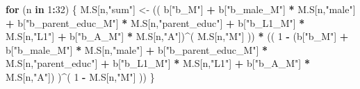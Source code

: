 \documentclass[
]{book}
\newenvironment{Shaded}{\begin{snugshade}}{\end{snugshade}}
\newcommand{\ControlFlowTok}[1]{\textcolor[rgb]{0.13,0.29,0.53}{\textbf{#1}}}
\newcommand{\DecValTok}[1]{\textcolor[rgb]{0.00,0.00,0.81}{#1}}
\newcommand{\NormalTok}[1]{#1}
\newcommand{\OtherTok}[1]{\textcolor[rgb]{0.56,0.35,0.01}{#1}}
\newcommand{\SpecialCharTok}[1]{\textcolor[rgb]{0.81,0.36,0.00}{\textbf{#1}}}
\newcommand{\StringTok}[1]{\textcolor[rgb]{0.31,0.60,0.02}{#1}}
\begin{document}
\begin{Shaded}
\begin{Highlighting}[]
  \ControlFlowTok{for}\NormalTok{ (n }\ControlFlowTok{in} \DecValTok{1}\SpecialCharTok{:}\DecValTok{32}\NormalTok{) \{}
\NormalTok{    M.S[n,}\StringTok{"sum"}\NormalTok{] }\OtherTok{\textless{}{-}}\NormalTok{ (( b[}\StringTok{"b\_M"}\NormalTok{] }\SpecialCharTok{+}                                                              
\NormalTok{                         b[}\StringTok{"b\_male\_M"}\NormalTok{] }\SpecialCharTok{*}\NormalTok{ M.S[n,}\StringTok{"male"}\NormalTok{] }\SpecialCharTok{+} 
\NormalTok{                         b[}\StringTok{"b\_parent\_educ\_M"}\NormalTok{] }\SpecialCharTok{*}\NormalTok{ M.S[n,}\StringTok{"parent\_educ"}\NormalTok{] }\SpecialCharTok{+} 
\NormalTok{                         b[}\StringTok{"b\_L1\_M"}\NormalTok{] }\SpecialCharTok{*}\NormalTok{ M.S[n,}\StringTok{"L1"}\NormalTok{] }\SpecialCharTok{+}
\NormalTok{                         b[}\StringTok{"b\_A\_M"}\NormalTok{] }\SpecialCharTok{*}\NormalTok{ M.S[n,}\StringTok{"A"}\NormalTok{])}\SpecialCharTok{\^{}}\NormalTok{( M.S[n,}\StringTok{"M"}\NormalTok{] )) }\SpecialCharTok{*}
\NormalTok{      (( }\DecValTok{1} \SpecialCharTok{{-}}\NormalTok{ (b[}\StringTok{"b\_M"}\NormalTok{] }\SpecialCharTok{+} 
\NormalTok{                b[}\StringTok{"b\_male\_M"}\NormalTok{] }\SpecialCharTok{*}\NormalTok{ M.S[n,}\StringTok{"male"}\NormalTok{] }\SpecialCharTok{+} 
\NormalTok{                b[}\StringTok{"b\_parent\_educ\_M"}\NormalTok{] }\SpecialCharTok{*}\NormalTok{ M.S[n,}\StringTok{"parent\_educ"}\NormalTok{] }\SpecialCharTok{+} 
\NormalTok{                b[}\StringTok{"b\_L1\_M"}\NormalTok{] }\SpecialCharTok{*}\NormalTok{ M.S[n,}\StringTok{"L1"}\NormalTok{] }\SpecialCharTok{+}
\NormalTok{                b[}\StringTok{"b\_A\_M"}\NormalTok{] }\SpecialCharTok{*}\NormalTok{ M.S[n,}\StringTok{"A"}\NormalTok{]) )}\SpecialCharTok{\^{}}\NormalTok{( }\DecValTok{1} \SpecialCharTok{{-}}\NormalTok{ M.S[n,}\StringTok{"M"}\NormalTok{] )) }
\NormalTok{    \}}
  

\end{Highlighting}
\end{Shaded}
\end{document}
